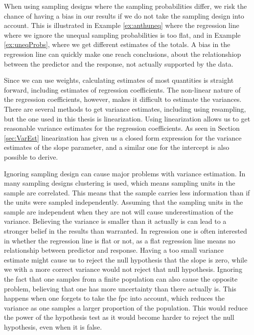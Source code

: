 \documentclass{article}
\begin{document}

When using sampling designs where the sampling probabilities differ, we risk the
chance of having a bias in our results if we do not take the sampling design into account. This
is illustrated in Example \ref{ex:anthuneq} where the regression line where we ignore the
unequal sampling probabilities is too flat, and in Example \ref{ex:uneqProbs},
where we get different estimates of the totals. A bias in the regression line
can quickly make one reach conclusions, about the relationshiop between the
predictor and the response, not actually supported by the data.


Since we can use weights, calculating estimates of most quantities is
straight forward, including estimates of regression coefficients. The non-linear nature
of the regression coefficients, however, makes it difficult to estimate the
variances. There are several methods to get variance estimates, including using
resampling, but the one used in this thesis is linearization. Using
linearization allows us to get reasonable variance estimates for the regression
coefficients. As seen in Section \ref{sec:VarEst} linearization has given us a
closed form expression for the variance estimates of the slope parameter, and a
similar one for the intercept is also possible to derive.

%

Ignoring sampling design can cause major problems with variance estimation. In
many sampling designs clustering is used, which means sampling units in the sample are correlated. This means
that the sample carries less information than if the units were sampled independently.
Assuming that the sampling units in the sample are independent when they are not
will cause underestimation of the variance. Believing the variance is smaller
than it actually is can lead to a stronger belief in the results than warranted.
In regression one is often interested in whether the regression line is flat or
not, as a flat regression line means no relationship between predictor and response. Having a too small variance estimate might cause us to reject the null
hypothesis that the slope is zero, while we with a more correct variance would
not reject that null hypothesis. Ignoring the fact that one samples from a
finite population can also cause the opposite problem, believing that one has
more uncertainty than there actually is. This happens when one forgets to take
the fpc into account, which reduces the variance as one samples a larger
proportion of the population. This would reduce the power of the hypothesis test
as it would become harder to reject the null hypothesis, even when it is false.
\end{document}
